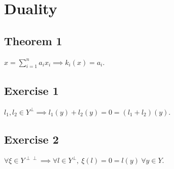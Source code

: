 \section{Duality}

\subsection*{Theorem 1}
$x = \sum_{i=1}^{n} a_i x_i \implies k_i(x) = a_i$.

\subsection{Exercise 1}
$l_1, l_2 \in Y^{\perp} \implies l_1(y) + l_2(y) = 0 = (l_1 + l_2)(y)$.

\subsection{Exercise 2}
$\forall \xi \in Y^{\perp \perp} \implies \forall l \in Y^{\perp}, \: \xi(l) = 0 = l(y) \: \forall y \in Y$.

